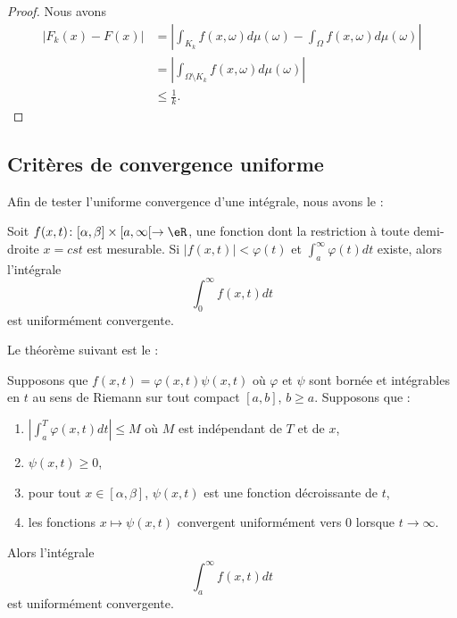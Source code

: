 \begin{proof}
    Nous avons
    \begin{subequations}
        \begin{align}
            \big| F_k(x)-F(x) \big|&=\left| \int_{K_k}f(x,\omega)d\mu(\omega)-\int_{\Omega}f(x,\omega)d\mu(\omega) \right| \\
            &=| \int_{\Omega\setminus K_k}f(x,\omega)d\mu(\omega) |\\
            &\leq \frac{1}{ k }.
        \end{align}
    \end{subequations}
\end{proof}

\subsection{Critères de convergence uniforme}

Afin de tester l'uniforme convergence d'une intégrale, nous avons le :
\begin{theorem}		\label{ThoCritWeiIntUnifCv}
Soit $f(x,t)\colon [\alpha,\beta]\times[a,\infty[ \to \eR$, une fonction dont la restriction à toute demi-droite $x=cst$ est mesurable. Si $| f(x,t) |< \varphi(t)$ et $\int_a^{\infty}\varphi(t)dt$ existe, alors l'intégrale
\begin{equation}
	\int_0^{\infty}f(x,t)dt
\end{equation}
est uniformément convergente.
\end{theorem}

Le théorème suivant est le  :
\begin{theorem}		\label{ThoAbelIntUnif}
	Supposons que $f(x,t)=\varphi(x,t)\psi(x,t)$ où $\varphi$ et $\psi$ sont bornée et intégrables en $t$ au sens de Riemann sur tout compact $[a,b]$, $b\geq a$. Supposons que :
	\begin{enumerate}
		\item $| \int_a^{T}\varphi(x,t)dt |\leq M$ où $M$ est indépendant de $T$ et de $x$,
		\item $\psi(x,t)\geq 0$,
		\item pour tout $x\in[\alpha,\beta]$, $\psi(x,t)$ est une fonction décroissante de $t$,
		\item les fonctions $x\mapsto \psi(x,t)$ convergent uniformément vers $0$ lorsque $t\to\infty$.
	\end{enumerate}
	Alors l'intégrale
	\begin{equation}
		\int_a^{\infty}f(x,t)dt
	\end{equation}
	est uniformément convergente.
\end{theorem}

